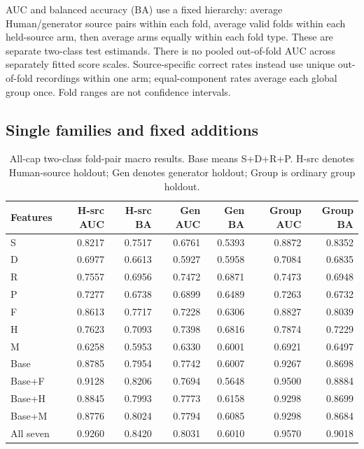 AUC and balanced accuracy (BA) use a fixed hierarchy: average Human/generator source pairs within each fold, average valid folds within each held-source arm, then average arms equally within each fold type. These are separate two-class test estimands. There is no pooled out-of-fold AUC across separately fitted score scales. Source-specific correct rates instead use unique out-of-fold recordings within one arm; equal-component rates average each global group once. Fold ranges are not confidence intervals.

\subsection{Single families and fixed additions}

\begin{table}[htbp]
\centering\small
\begin{tabular}{@{}lrrrrrr@{}}
\toprule
Features & H-src AUC & H-src BA & Gen AUC & Gen BA & Group AUC & Group BA \\
\midrule
S & 0.8217 & 0.7517 & 0.6761 & 0.5393 & 0.8872 & 0.8352 \\
D & 0.6977 & 0.6613 & 0.5927 & 0.5958 & 0.7084 & 0.6835 \\
R & 0.7557 & 0.6956 & 0.7472 & 0.6871 & 0.7473 & 0.6948 \\
P & 0.7277 & 0.6738 & 0.6899 & 0.6489 & 0.7263 & 0.6732 \\
F & 0.8613 & 0.7717 & 0.7228 & 0.6306 & 0.8827 & 0.8039 \\
H & 0.7623 & 0.7093 & 0.7398 & 0.6816 & 0.7874 & 0.7229 \\
M & 0.6258 & 0.5953 & 0.6330 & 0.6001 & 0.6921 & 0.6497 \\
Base & 0.8785 & 0.7954 & 0.7742 & 0.6007 & 0.9267 & 0.8698 \\
Base+F & 0.9128 & 0.8206 & 0.7694 & 0.5648 & 0.9500 & 0.8884 \\
Base+H & 0.8845 & 0.7993 & 0.7773 & 0.6158 & 0.9298 & 0.8699 \\
Base+M & 0.8776 & 0.8024 & 0.7794 & 0.6085 & 0.9298 & 0.8684 \\
All seven & 0.9260 & 0.8420 & 0.8031 & 0.6010 & 0.9570 & 0.9018 \\
\bottomrule
\end{tabular}
\caption{All-cap two-class fold-pair macro results. Base means S+D+R+P. H-src denotes Human-source holdout; Gen denotes generator holdout; Group is ordinary group holdout.}
\end{table}

